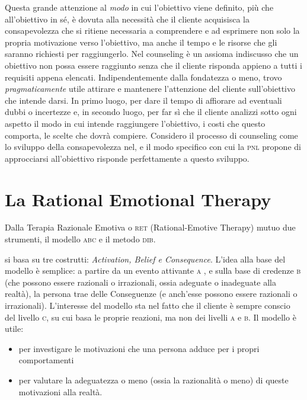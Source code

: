 \noindent Questa grande attenzione al \emph{modo} in cui l'obiettivo viene definito, più che all'obiettivo in sé, è dovuta alla necessità che il cliente acquisisca la consapevolezza che si ritiene necessaria a comprendere e ad esprimere non solo la propria motivazione verso l'obiettivo, ma anche il tempo e le risorse che gli saranno richiesti per raggiungerlo.
Nel counseling è un assioma indiscusso che un obiettivo non possa essere raggiunto senza che il cliente risponda appieno a tutti i requisiti appena elencati. Indipendentemente dalla fondatezza o meno, trovo \emph{pragmaticamente} utile attirare e mantenere l'attenzione del cliente sull'obiettivo che intende darsi.
In primo luogo, per dare il tempo di affiorare ad eventuali dubbi o incertezze e, in secondo luogo, per far sì che il cliente analizzi sotto ogni aspetto il modo in cui intende raggiungere l'obiettivo, i costi che questo comporta, le scelte che dovrà compiere. Considero il processo di counseling come lo sviluppo della consapevolezza nel, e il modo specifico con cui la \textsc{pnl} propone di approcciarsi all'obiettivo risponde perfettamente a questo sviluppo.

\section{La Rational Emotional Therapy}\label{sec:ret}
Dalla Terapia Razionale Emotiva o \textsc{ret} (Rational-Emotive Therapy)\cite{ret} mutuo due strumenti, il modello \textsc{abc} e il metodo \textsc{dib}.

 si basa su tre costrutti: \textit{Activation, Belief \textrm{e} Consequence}. L'idea alla base del modello è semplice: a partire da un evento attivante \textsc{a} , e sulla base di credenze \textsc{b} (che possono essere razionali o irrazionali, ossia adeguate o inadeguate alla realtà), la persona trae delle Conseguenze (e anch'esse possono essere razionali o irrazionali). L'interesse del modello sta nel fatto che il cliente è sempre conscio del livello \textsc{c}, su cui basa le proprie reazioni, ma non dei livelli \textsc{a} e \textsc{b}. Il modello è utile:
\begin{itemize}
\item per investigare le motivazioni che una persona adduce per i propri comportamenti
\item per valutare la adeguatezza o meno (ossia la razionalità o meno) di queste motivazioni alla realtà.
\end{itemize}

